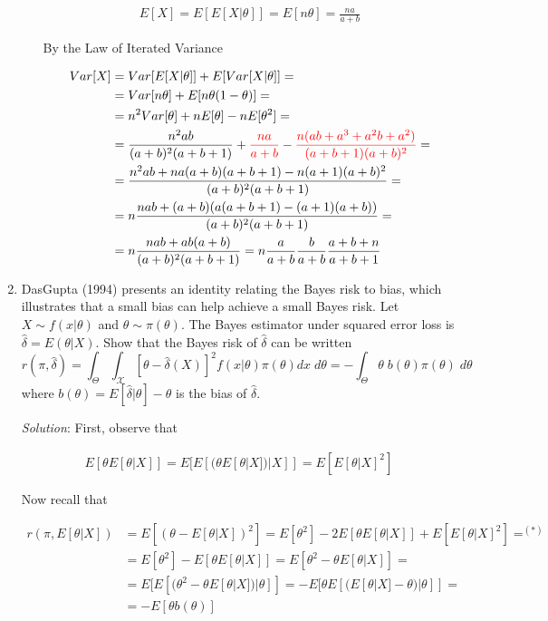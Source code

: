 \documentclass[11pt]{article}
\begin{document}
\begin{enumerate}
\begin{enumerate}
\begin{align*}
E[X] = E[E[X|\theta]] = E[n\theta] = \frac{na}{a+b}
\end{align*}

By the Law of Iterated Variance

\begin{align*}
Var[X]	&= Var[E[X|\theta]] + E[Var[X|\theta]] = \\
				&= Var[n\theta] + E[n\theta(1-\theta)] = \\
				&= n^{2}Var[\theta] + nE[\theta] - nE[\theta^{2}] = \\
				&= \frac{n^{2}ab}{(a+b)^{2}(a+b+1)} + \textcolor{red}{ \frac{na}{a+b}} -\textcolor{red}{ \frac{n(ab +a^3 +a^2b+a^2)}{(a+b+1)(a+b)^2}} = \\
				&= \frac{n^{2}ab +na(a+b)(a+b+1) - n(a+1)(a+b)^{2}}{(a+b)^{2}(a+b+1)} = \\
				&= n\frac{nab +(a+b)(a(a+b+1)-(a+1)(a+b))}{(a+b)^{2}(a+b+1)} = \\
				&= n\frac{nab + ab(a+b)}{(a+b)^{2}(a+b+1)} = n\frac{a}{a+b}\frac{b}{a+b}\frac{a+b+n}{a+b+1}
\end{align*}

\end{enumerate}

\item DasGupta (1994) presents an identity relating the Bayes risk to bias, which illustrates that a small bias can help achieve a small Bayes risk. Let $X \sim f(x|\theta)$ and $\theta \sim \pi(\theta).$ The Bayes estimator under squared error loss is 
$\hat{\delta} = E(\theta|X).$ Show that the Bayes risk of $\hat{\delta}$ can be written 
$$r(\pi,\hat{\delta} ) 
= \int_{\Theta} \int_{\mathcal{X}} 
[\theta - \hat{\delta}(X)]^2 f(x|\theta) \pi(\theta) dx \; d\theta =
- \int_{\Theta} \theta\; b(\theta) \pi(\theta)\; d\theta$$
where $b(\theta) = E[\hat{\delta} | \theta] - \theta$ is the bias of $\hat{\delta} .$

\emph{Solution}: First, observe that

\begin{align}
	\label{eqn4.1}
	E[\theta E[\theta|X]] = E[E[(\theta E[\theta|X])|X]] = E[E[\theta|X]^{2}]
\end{align}

Now recall that

\begin{align*}
	r(\pi,E[\theta|X])	&= E[(\theta-E[\theta|X])^{2}] = E[\theta^{2}] -2E[\theta E[\theta|X]] + E[E[\theta|X]^{2}] =^{(*)} \\
											&= E[\theta^{2}] - E[\theta E[\theta|X]] = E[\theta^{2}-\theta E[\theta|X]] = \\
											&= E[E[(\theta^{2} - \theta E[\theta|X])|\theta]] = -E[\theta E[(E[\theta|X]-\theta)|\theta]] = \\
											&= -E[\theta b(\theta)]
\end{align*}


\end{enumerate}
\end{document}
